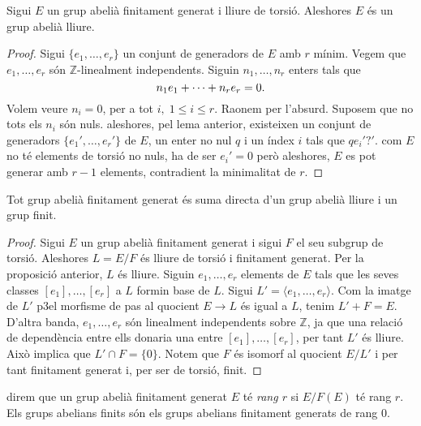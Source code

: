 \documentclass[../main.tex]{subfiles}
\begin{document}
\begin{prop}
Sigui $E$ un grup abelià finitament generat i lliure de torsió. Aleshores $E$ és un grup abelià lliure.
\end{prop}
\begin{proof}
Sigui $\{e_1,\ldots,e_r\}$ un conjunt de generadors de $E$ amb $r$ mínim. Vegem que $e_1,\ldots,e_r$ són $\mathbb{Z}$-linealment independents. Siguin $n_1,\ldots,n_r$ enters tals que
\begin{equation}
    \notag
    n_1e_1+\cdots+n_re_r = 0.
\end{equation}
Volem veure $n_i = 0$, per a tot $i,\;1\leq i \leq r$. Raonem per l'absurd. Suposem que no tots els $n_i$ són nuls. aleshores, pel lema anterior, existeixen un conjunt de generadors $\{e_1',\ldots,e_r'\}$ de $E$, un enter no nul $q$ i un índex $i$ tals que $qe_i' ? '$. com $E$ no té elements de torsió no nuls, ha de ser $e_i' = 0$ però aleshores, $E$ es pot generar amb $r-1$ elements, contradient la minimalitat de $r$.
\end{proof}

\begin{prop}
Tot grup abelià finitament generat és suma directa d'un grup abelià lliure i un grup finit.
\end{prop}
\begin{proof}
Sigui $E$ un grup abelià finitament generat i sigui $F$ el seu subgrup de torsió. Aleshores $L = E/F$ és lliure de torsió i finitament generat. Per la proposició anterior, $L$ és lliure. Siguin $e_1,\ldots,e_r$ elements de $E$ tals que les seves classes $[e_1],\ldots,[e_r]$ a $L$ formin base de $L$. Sigui $L' = \langle e_1,\ldots,e_r\rangle$. Com la imatge de $L'$ p3el morfisme de pas al quocient $E\rightarrow L$ és igual a $L$, tenim $L'+F = E$. D'altra banda, $e_1,\ldots,e_r$ són linealment independents sobre $\mathbb{Z}$, ja que una relació de dependència entre ells donaria una entre $[e_1],\ldots,[e_r]$, per tant $L'$ és lliure. Això implica que $L'\cap F = \{0\}$. Notem que $F$ és isomorf al quocient $E/L'$ i per tant finitament generat i, per ser de torsió, finit.
\end{proof}

direm que un grup abelià finitament generat $E$ té \textit{rang $r$} si $E/F(E)$ té rang $r$. Els grups abelians finits són els grups abelians finitament generats de rang 0.
\end{document}
